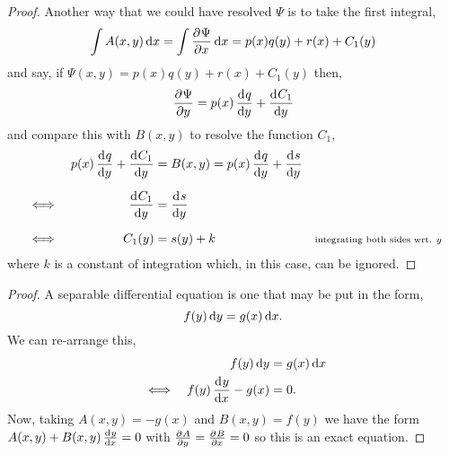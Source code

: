 \documentclass[../MathsNotesBase.tex]{subfiles}
\begin{document}
{\begin{tcolorbox}[breakable,enhanced jigsaw,colframe=white,colback=white,boxrule=0pt,arc=0pt,left=0pt,right=0pt,top=0pt,bottom=0pt]
\begin{proof}
				Another way that we could have resolved $\Psi$ is to take the first integral,
				\[ \int A(x,y) \dif x = \int \dpd{\Psi}{x} \dif x = p(x) q(y) + r(x) + C_1(y) \]
				and say, if ${ \Psi(x,y) = p(x) q(y) + r(x) + C_1(y) }$ then,
				\[ \dpd{\Psi}{y} = p(x) \dod{q}{y} + \dod{C_1}{y} \]
				and compare this with ${ B(x,y) }$ to resolve the function $C_1$,
				\begin{align*}
					&& p(x) \dod{q}{y} + \dod{C_1}{y} &= B(x,y) = p(x) \dod{q}{y} + \dod{s}{y} \nn
					&\iff & \dod{C_1}{y} &= \dod{s}{y} \nn
					&\iff & C_1(y) &= s(y) + k &\sidecomment{integrating both sides wrt. $y$}
				\end{align*}
				where $k$ is a constant of integration which, in this case, can be ignored.
			\end{proof}
		\end{tcolorbox}
	
		\medskip
		\begin{tcolorbox}[breakable,enhanced jigsaw,colframe=white,colback=white,boxrule=0pt,arc=0pt,left=0pt,right=0pt,top=0pt,bottom=0pt]
			\begin{proof}
				A separable differential equation is one that may be put in the form,
				\[ f(y) \dif y = g(x) \dif x. \]
				We can re-arrange this,
				\begin{align*}
					&& f(y) \dif y &= g(x) \dif x \\
					&\iff & f(y) \dod{y}{x} - g(x) &= 0.
				\end{align*}
				Now, taking ${ A(x,y) = -g(x) }$ and ${ B(x,y) = f(y) }$ we have the form ${ A(x,y) + B(x,y) \tod{y}{x} = 0 }$ with ${ \tpd{A}{y} = \tpd{B}{x} = 0 }$ so this is an exact equation.
			\end{proof}
		\end{tcolorbox}
		
		
		
		\biggerskip\biggerskip
		
}
\end{document}
